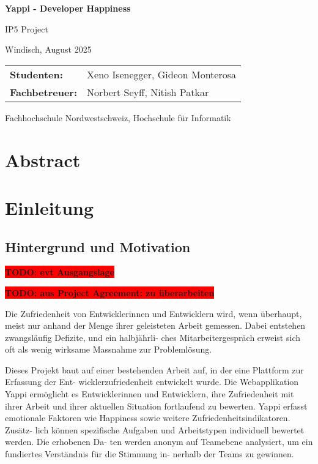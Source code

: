 \documentclass[12pt,a4paper]{report}
\newcommand{\todo}[1]{\colorbox{red}{\textbf{TODO: #1}}}
\begin{document}
\begin{titlepage}
	\centering
	{\huge \textbf{Yappi - Developer Happiness} \par}
	{\large IP5 Project \par}
	\vspace{0.5cm}
	{Windisch, August 2025 \par}
	\vspace{0.5cm}

	\begin{tabular}{@{}ll@{}}
		\textbf{Studenten:}    & Xeno Isenegger, Gideon Monterosa \\
		\textbf{Fachbetreuer:} & Norbert Seyff, Nitish Patkar
	\end{tabular}

	\vfill
	{Fachhochschule Nordwestschweiz, Hochschule für Informatik \par}
\end{titlepage}

\chapter*{Abstract}
\newpage

\tableofcontents
\newpage

\listoffigures
\newpage

\listoftables
\newpage

\chapter{Einleitung}

\section{Hintergrund und Motivation}
\todo{evt Ausgangslage}

\todo{aus Project Agreement: zu überarbeiten}

Die Zufriedenheit von Entwicklerinnen und Entwicklern wird, wenn überhaupt, meist nur anhand der
Menge ihrer geleisteten Arbeit gemessen. Dabei entstehen zwangsläufig Defizite, und ein halbjährli-
ches Mitarbeitergespräch erweist sich oft als wenig wirksame Massnahme zur Problemlösung.

Dieses Projekt baut auf einer bestehenden Arbeit auf, in der eine Plattform zur Erfassung der Ent-
wicklerzufriedenheit entwickelt wurde. Die Webapplikation Yappi ermöglicht es Entwicklerinnen und
Entwicklern, ihre Zufriedenheit mit ihrer Arbeit und ihrer aktuellen Situation fortlaufend zu bewerten.
Yappi erfasst emotionale Faktoren wie Happiness sowie weitere Zufriedenheitsindikatoren. Zusätz-
lich können spezifische Aufgaben und Arbeitstypen individuell bewertet werden. Die erhobenen Da-
ten werden anonym auf Teamebene analysiert, um ein fundiertes Verständnis für die Stimmung in-
nerhalb der Teams zu gewinnen.
\end{document}
